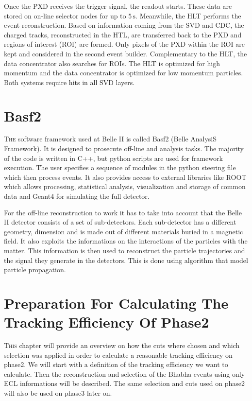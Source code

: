 \documentclass[a4paper,11pt,twosided,final,german,openbib,pdftex,listof=totoc,bibliography=totoc]{scrbook}
\begin{document}
Once the PXD receives the trigger signal, the readout starts. These data are stored on on-line selector nodes for up to $5\,\textrm{s}$. Meanwhile, the HLT performs the event reconstruction. Based on information coming from the SVD and CDC, the charged tracks, reconstructed in the HTL, are transferred back to the PXD and regions of interest (ROI) are formed. Only pixels of the PXD within the ROI are kept and considered in the second event builder. Complementary to the HLT, the data concentrator also searches for ROIs. The HLT is optimized for high momentum and the data concentrator is optimized for low momentum particles. Both systems require hits in all SVD layers. \cite{B2TR}


\chapter{Basf2}
\label{sec:Tools}

\lettrine{T}{he} software framework used at Belle II is called Basf2 (Belle AnalysiS Framework). It is designed to prosecute off-line and analysis tasks. The majority of the code is written in C++, but python scripts are used for framework execution. The user specifies a sequence of modules in the python steering file which then process events. It also provides access to external libraries like ROOT which allows processing, statistical analysis, visualization and storage of common data and Geant4 for simulating the full detector.\cite{Moll_2011}


For the off-line reconstruction to work it has to take into account that the Belle II detector consists of a set of sub-detectors. Each sub-detector has a different geometry, dimension and is made out of different materials buried in a magnetic field. It also exploits the informations on the interactions of the particles with the matter. This information is then used to reconstruct the particle trajectories and the signal they generate in the detectors. This is done using algorithm that model particle propagation.

\chapter{Preparation  For Calculating The Tracking Efficiency Of Phase2}
\label{chap:Phase2Eff}

\lettrine{T}{his} chapter will provide an overview on how the cuts where chosen and which selection was applied in order to calculate a reasonable tracking efficiency on phase2. We will start with a definition of the tracking efficiency we want to calculate. Then the reconstruction and selection of the Bhabha events using only ECL informations will be described. The same selection and cuts used on phase2 will also be used on phase3 later on.
\end{document}

